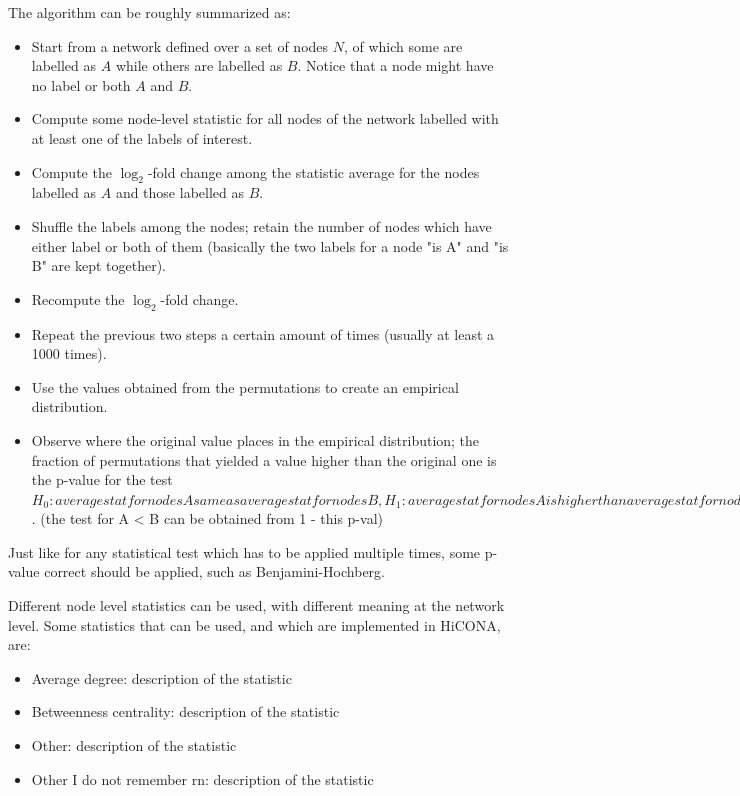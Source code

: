 The algorithm can be roughly summarized as:
\begin{itemize}\tightlist
  \item Start from a network defined over a set of nodes $N$, of which some are labelled as $A$ while others are labelled as $B$. Notice that a node might have no label or both $A$ and $B$.
  \item Compute some node-level statistic for all nodes of the network labelled with at least one of the labels of interest.
  \item Compute the $\log_2$-fold change among the statistic average for the nodes labelled as $A$ and those labelled as $B$.
  \item Shuffle the labels among the nodes; retain the number of nodes which have either label or both of them (basically the two labels for a node "is A" and "is B" are kept together).
  \item Recompute the $\log_2$-fold change.
  \item Repeat the previous two steps a certain amount of times (usually at least a 1000 times).
  \item Use the values obtained from the permutations to create an empirical distribution.
  \item Observe where the original value places in the empirical distribution; the fraction of permutations that yielded a value higher than the original one is the p-value for the test
  $H_0: average stat for nodes A same as average stat for nodes B, H_1: average stat for nodes A is higher than average stat for nodes B$. (the test for A < B can be obtained from 1 - this p-val)
\end{itemize}

Just like for any statistical test which has to be applied multiple times, some p-value correct should be applied, such as Benjamini-Hochberg.

Different node level statistics can be used, with different meaning at the network level. Some statistics that can be used, and which are implemented in HiCONA, are:
\begin{itemize}\tightlist
  \item Average degree: description of the statistic
  \item Betweenness centrality: description of the statistic
  \item Other: description of the statistic
  \item Other I do not remember rn: description of the statistic
\end{itemize}

